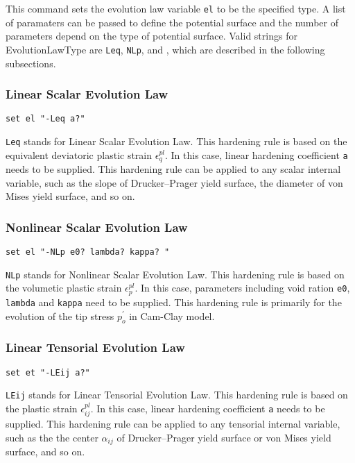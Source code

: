 This  command sets the evolution law variable \texttt{el} to be
the  specified  type.  A  list  of  paramaters can be passed to
define  the  potential  surface  and  the  number of parameters
depend  on  the  type  of  potential surface. Valid strings for
EvolutionLawType are \texttt{Leq}, \texttt{NLp}, and \texttt{},
which are described in the following subsections.

\subsubsection{Linear Scalar Evolution Law} 
\label{leq_el}
\begin{verbatim}
set el "-Leq a?"
\end{verbatim}

\texttt{Leq}  stands  for  Linear  Scalar  Evolution  Law. This
hardening  rule  is  based on the equivalent deviatoric plastic
strain $\epsilon_q^{pl}$. In this case, linear hardening coefficient
\texttt{a}  needs  to  be  supplied. This hardening rule can be
applied  to  any scalar internal variable, such as the slope of
Drucker--Prager  yield  surface, the diameter of von Mises yield
surface, and so on.

\subsubsection{Nonlinear Scalar Evolution Law} 
\label{nlp_el}

\begin{verbatim}
set el "-NLp e0? lambda? kappa? "
\end{verbatim}

\texttt{NLp}  stands  for  Nonlinear Scalar Evolution Law. This
hardening  rule  is  based  on  the  volumetic  plastic  strain
$\epsilon_p^{pl}$.  In  this  case, parameters including void ration
\texttt{e0},  \texttt{lambda} and  \texttt{kappa}  need   to  be  supplied. This
hardening rule is primarily for the evolution of the tip stress
$p^{'}_{o}$ in Cam-Clay model.

\subsubsection{Linear Tensorial Evolution Law} 
\label{LEij}
\begin{verbatim}
set et "-LEij a?"
\end{verbatim}

\texttt{LEij}  stands  for  Linear Tensorial Evolution Law. This
hardening    rule    is    based    on   the   plastic   strain
$\epsilon_{ij}^{pl}$. In this case, linear hardening
coefficient  \texttt{a}  needs  to  be supplied. This hardening
rule can be applied to any tensorial internal variable, such as
the  the  center  $\alpha_{ij}$ of Drucker--Prager yield surface
or von Mises yield surface, and so on.

